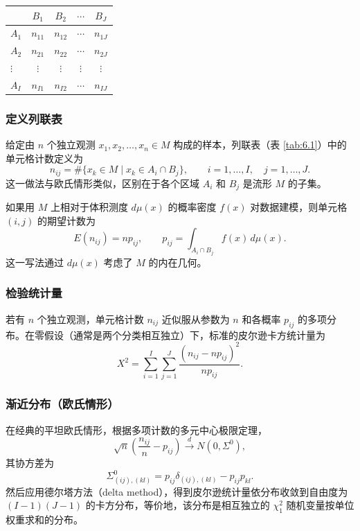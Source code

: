 \begin{table}[htbp]
  \centering
  \begin{tabular}{lcccc}
    \toprule
          & $B_1$ & $B_2$ & $\cdots$ & $B_J$\\
    \midrule
    $A_1$ & $n_{11}$ & $n_{12}$ & $\cdots$ & $n_{1J}$\\
    $A_2$ & $n_{21}$ & $n_{22}$ & $\cdots$ & $n_{2J}$\\
    $\vdots$ & $\vdots$ & $\vdots$ & $\vdots$ & $\vdots$\\
    $A_I$ & $n_{I1}$ & $n_{I2}$ & $\cdots$ & $n_{IJ}$\\
    \bottomrule
  \end{tabular}
\end{table}

\subsubsection{定义列联表}

给定由 $n$ 个独立观测 $x_1,x_2,\ldots,x_n\in M$ 构成的样本，列联表（表 \ref{tab:6.1}）中的单元格计数定义为
\[
  n_{ij}=\#\{x_k\in M\mid x_k\in A_i\cap B_j\},
  \qquad i=1,\ldots,I,\quad j=1,\ldots,J.
\]
这一做法与欧氏情形类似，区别在于各个区域 $A_i$ 和 $B_j$ 是流形 $M$ 的子集。

如果用 $M$ 上相对于体积测度 $d\mu(x)$ 的概率密度 $f(x)$ 对数据建模，则单元格 $(i,j)$ 的期望计数为
\[
  E(n_{ij})=np_{ij},\qquad p_{ij}=\int_{A_i\cap B_j}f(x)\,d\mu(x).
\]
这一写法通过 $d\mu(x)$ 考虑了 $M$ 的内在几何。

\subsubsection{检验统计量}

若有 $n$ 个独立观测，单元格计数 $n_{ij}$ 近似服从参数为 $n$ 和各概率 $p_{ij}$ 的多项分布。在零假设（通常是两个分类相互独立）下，标准的皮尔逊卡方统计量为
\begin{equation*}
  X^2=\sum_{i=1}^I\sum_{j=1}^J\frac{(n_{ij}-np_{ij})^2}{np_{ij}}.
  \tag{6.34}\label{eq:6.34}
\end{equation*}

\subsubsection{渐近分布（欧氏情形）}

在经典的平坦欧氏情形，根据多项计数的多元中心极限定理，
\begin{equation*}
  \sqrt n\left(\frac{n_{ij}}{n}-p_{ij}\right)\xrightarrow{d}N(0,\Sigma^0),
  \tag{6.35}\label{eq:6.35}
\end{equation*}
其协方差为
\[
  \Sigma^0_{(ij),(kl)}=p_{ij}\delta_{(ij),(kl)}-p_{ij}p_{kl}.
\]
然后应用德尔塔方法（delta method），得到皮尔逊统计量依分布收敛到自由度为 $(I-1)(J-1)$ 的卡方分布，等价地，该分布是相互独立的 $\chi_1^2$ 随机变量按单位权重求和的分布。

